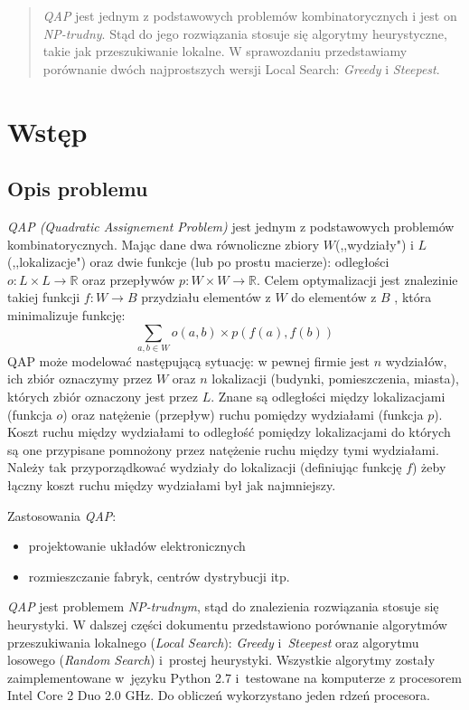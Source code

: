 \documentclass{article}
\begin{document}


\begin{abstract}
\emph{QAP} jest jednym z podstawowych problemów kombinatorycznych i jest on \emph{NP-trudny}. Stąd do jego rozwiązania stosuje się algorytmy heurystyczne, takie jak przeszukiwanie lokalne. W sprawozdaniu przedstawiamy porównanie dwóch najprostszych wersji Local Search: \emph{Greedy} i \emph{Steepest}.
\end{abstract}


\section{Wstęp}
	\subsection{Opis problemu}
	\emph{QAP (Quadratic Assignement Problem)} jest jednym z podstawowych problemów kombinatorycznych. Mając dane dwa równoliczne zbiory $W$(,,wydziały") i $L$(,,lokalizacje") oraz dwie funkcje (lub po prostu macierze): odległości $o:  L \times L \rightarrow \mathbb{R} $ oraz przepływów $p: W \times W \rightarrow \mathbb{R} $. Celem optymalizacji jest znalezinie takiej funkcji $ f: W \rightarrow B $  przydziału elementów z $W$ do elementów z $B$ , która minimalizuje funkcję:
	$$\sum_{a,b \in W}o(a,b)\times p(f(a),f(b))$$
	QAP może modelować następującą sytuację: w pewnej firmie jest $n$ wydziałów, ich zbiór oznaczymy przez $W$ oraz $n$ lokalizacji (budynki, pomieszczenia, miasta), których zbiór oznaczony jest przez $L$. Znane są odległości między lokalizacjami (funkcja $o$) oraz natężenie (przepływ) ruchu pomiędzy wydziałami (funkcja $p$). Koszt ruchu między wydziałami to odległość pomiędzy lokalizacjami do których są one przypisane pomnożony przez natężenie ruchu między tymi wydziałami. Należy tak przyporządkować wydziały do lokalizacji (definiując funkcję $f$) żeby łączny koszt ruchu między wydziałami był jak najmniejszy.

	Zastosowania \emph{QAP}:
	\begin{itemize}
		\item{projektowanie układów elektronicznych}
		\item{rozmieszczanie fabryk, centrów dystrybucji itp.}
	\end{itemize}
	
	\emph{QAP} jest problemem \emph{NP-trudnym}, stąd do znalezienia rozwiązania stosuje się heurystyki. W dalszej części dokumentu przedstawiono porównanie algorytmów przeszukiwania lokalnego (\emph{Local Search}): \emph{Greedy} i~\emph{Steepest} oraz algorytmu losowego (\emph{Random Search}) i~prostej heurystyki. Wszystkie algorytmy zostały zaimplementowane w~języku Python 2.7 i~testowane na komputerze z procesorem Intel Core 2 Duo 2.0 GHz. Do obliczeń wykorzystano jeden rdzeń procesora.
\end{document}
